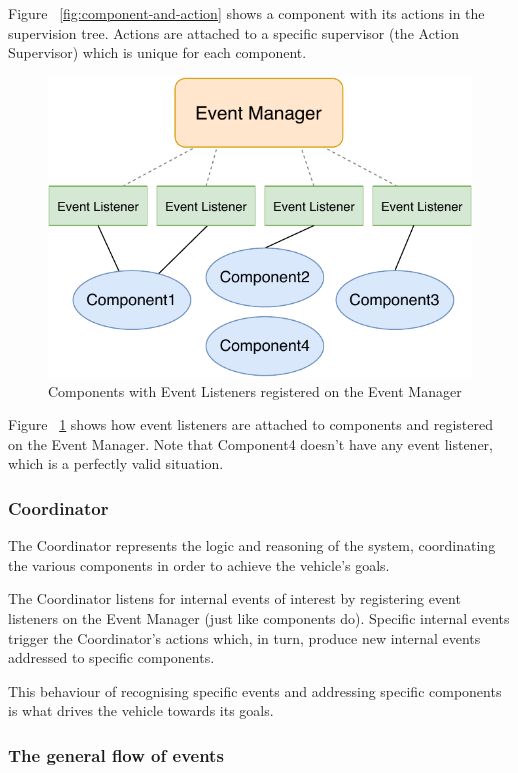 \documentclass{memoir}
\begin{document}
Figure ~\ref{fig:component-and-action} shows a component with its actions in the supervision tree. Actions are attached to a specific supervisor (the Action Supervisor) which is unique for each component.
\\

\begin{figure}
	\centering
	\includegraphics[width=0.7\linewidth]{implementation_details/components_event_listeners.pdf}
	\caption{Components with Event Listeners registered on the Event Manager}
	\label{fig:component-event-listeners}
\end{figure}


Figure ~\ref{fig:component-event-listeners} shows how event listeners are attached to components and registered on the Event Manager.
Note that Component4 doesn't have any event listener, which is a perfectly valid situation.

\subsubsection{Coordinator}

The Coordinator represents the logic and reasoning of the system, coordinating the various components in order to achieve the vehicle’s goals.

The Coordinator listens for internal events of interest by registering event listeners on the Event Manager (just like components do).
Specific internal events trigger the Coordinator's actions which, in turn, produce new internal events addressed to specific components. 

This behaviour of recognising specific events and addressing specific components is what drives the vehicle towards its goals.

\subsubsection{The general flow of events}
\end{document}
